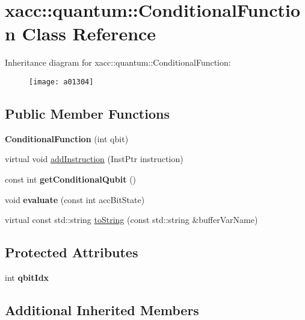 \hypertarget{a01304}{}\section{xacc\+:\+:quantum\+:\+:Conditional\+Function Class Reference}
\label{a01304}
Inheritance diagram for xacc\+:\+:quantum\+:\+:Conditional\+Function\+:\begin{figure}[H]
\begin{center}
\leavevmode
\texttt{[image: a01304]}
\end{center}
\end{figure}
\subsection*{Public Member Functions}
\begin{DoxyCompactItemize}
\item 
\mbox{\label{a01304_aa28610a08ae04d62ccdd8359433100c3}} 
{\bfseries Conditional\+Function} (int qbit)
\item 
virtual void \hyperlink{a01304_a6aedad20f96390880efdc0a476b3273f}{add\+Instruction} (Inst\+Ptr instruction)
\item 
\mbox{\label{a01304_a804317333b6677a041a3071b5108c0df}} 
const int {\bfseries get\+Conditional\+Qubit} ()
\item 
\mbox{\label{a01304_a709c236a5beb62d9a3bd5265196fb6c9}} 
void {\bfseries evaluate} (const int acc\+Bit\+State)
\item 
virtual const std\+::string \hyperlink{a01304_aca7a5f849fece6fc28a904efee9a3370}{to\+String} (const std\+::string \&buffer\+Var\+Name)
\end{DoxyCompactItemize}
\subsection*{Protected Attributes}
\begin{DoxyCompactItemize}
\item 
\mbox{\label{a01304_a0310536801417c0eded28a4dea1efa44}} 
int {\bfseries qbit\+Idx}
\end{DoxyCompactItemize}
\subsection*{Additional Inherited Members}


